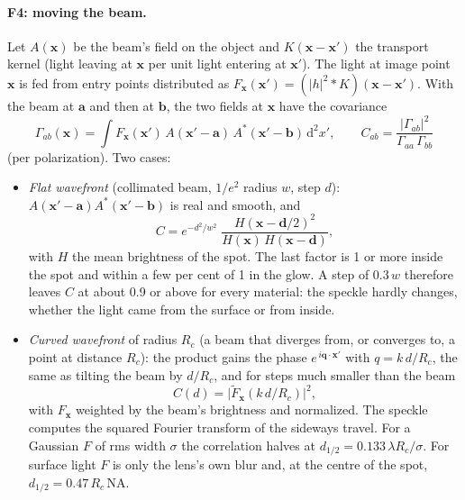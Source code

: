 \documentclass[11pt]{article}
\newcommand{\dd}{\mathrm{d}}
\begin{document}
\paragraph{F4: moving the beam.}\label{par:f4} Let $A(\mathbf{x})$ be the beam's field on the object and
$K(\mathbf{x}-\mathbf{x}')$ the transport kernel (light leaving at $\mathbf{x}$ per unit light entering at
$\mathbf{x}'$). The light at image point $\mathbf{x}$ is fed from entry points distributed as
$F_{\mathbf{x}}(\mathbf{x}')=(|h|^2*K)(\mathbf{x}-\mathbf{x}')$. With the beam at $\mathbf{a}$ and then at
$\mathbf{b}$, the two fields at $\mathbf{x}$ have the covariance
\begin{equation}
\Gamma_{ab}(\mathbf{x})=\int F_{\mathbf{x}}(\mathbf{x}')\,A(\mathbf{x}'-\mathbf{a})\,A^*(\mathbf{x}'-\mathbf{b})\,\dd^2x',
\qquad C_{ab}=\frac{|\Gamma_{ab}|^2}{\Gamma_{aa}\,\Gamma_{bb}} \tag{F4}
\end{equation}
(per polarization). Two cases:
\begin{itemize}
\item \emph{Flat wavefront} (collimated beam, $1/e^2$ radius $w$, step $d$): $A(\mathbf{x}'-\mathbf{a})A^*(\mathbf{x}'-\mathbf{b})$
  is real and smooth, and
  \begin{equation}
  C=e^{-d^2/w^2}\;\frac{H(\mathbf{x}-\mathbf{d}/2)^2}{H(\mathbf{x})\,H(\mathbf{x}-\mathbf{d})},
  \end{equation}
  with $H$ the mean brightness of the spot. The last factor is 1 or more inside the spot and within a few per cent of
  1 in the glow. A step of $0.3\,w$ therefore leaves $C$ at about 0.9 or above for every material: the speckle hardly
  changes, whether the light came from the surface or from inside.
\item \emph{Curved wavefront} of radius $R_c$ (a beam that diverges from, or converges to, a point at distance $R_c$):
  the product gains the phase $e^{\,i\mathbf{q}\cdot\mathbf{x}'}$ with $q=k\,d/R_c$, the same as tilting the beam by
  $d/R_c$, and for steps much smaller than the beam
  \begin{equation}
  C(d)=\bigl|\widetilde F_{\mathbf{x}}(k\,d/R_c)\bigr|^2 ,
  \end{equation}
  with $F_{\mathbf{x}}$ weighted by the beam's brightness and normalized.
  The speckle computes the squared Fourier transform of the sideways travel. For a Gaussian $F$ of rms width
  $\sigma$ the correlation halves at $d_{1/2}=0.133\,\lambda R_c/\sigma$. For surface light $F$ is only the lens's own
  blur and, at the centre of the spot, $d_{1/2}=0.47\,R_c\,\mathrm{NA}$.
\end{itemize}
\end{document}
